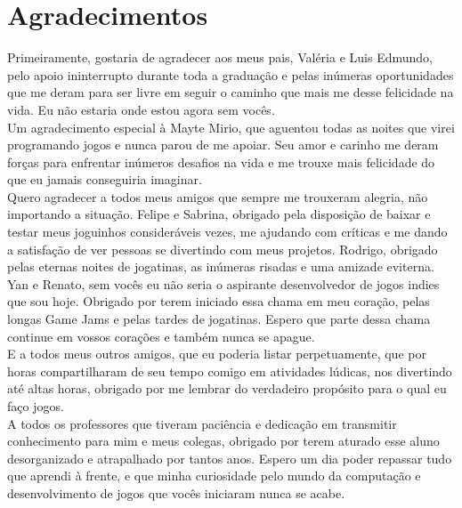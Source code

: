 \chapter*{Agradecimentos}

Primeiramente, gostaria de agradecer aos meus pais, Valéria e Luis Edmundo, pelo apoio ininterrupto durante toda a graduação e pelas inúmeras oportunidades que me deram para ser livre em seguir o caminho que mais me desse felicidade na vida. Eu não estaria onde estou agora sem vocês.\\

Um agradecimento especial à Mayte Mirio, que aguentou todas as noites que virei programando jogos e nunca parou de me apoiar. Seu amor e carinho me deram forças para enfrentar inúmeros desafios na vida e me trouxe mais felicidade do que eu jamais conseguiria imaginar.\\

Quero agradecer a todos meus amigos que sempre me trouxeram alegria, não importando a situação. Felipe e Sabrina, obrigado pela disposição de baixar e testar meus joguinhos consideráveis vezes, me ajudando com críticas e me dando a satisfação de ver pessoas se divertindo com meus projetos. Rodrigo, obrigado pelas eternas noites de jogatinas, as inúmeras risadas e uma amizade eviterna. Yan e Renato, sem vocês eu não seria o aspirante desenvolvedor de jogos indies que sou hoje. Obrigado por terem iniciado essa chama em meu coração, pelas longas Game Jams e pelas tardes de jogatinas. Espero que parte dessa chama continue em vossos corações e também nunca se apague.\\

E a todos meus outros amigos, que eu poderia listar perpetuamente, que por horas compartilharam de seu tempo comigo em atividades lúdicas, nos divertindo até altas horas, obrigado por me lembrar do verdadeiro propósito para o qual eu faço jogos.\\

A todos os professores que tiveram paciência e dedicação em transmitir conhecimento para mim e meus colegas, obrigado por terem aturado esse aluno desorganizado e atrapalhado por tantos anos. Espero um dia poder repassar tudo que aprendi à frente, e que minha curiosidade pelo mundo da computação e desenvolvimento de jogos que vocês iniciaram nunca se acabe.\\

